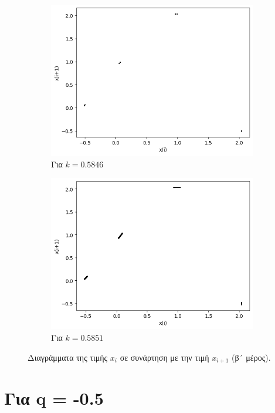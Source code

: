 \begin{figure}[ht]
\begin{subfigure}[b]{0.4\textwidth}
		\includegraphics[width=\textwidth]{LateX images/graphs q03/g13}
		\caption{Για $k=0.5846$}
		\label{f:k25}
	\end{subfigure}
	\hfill
	\begin{subfigure}[b]{0.4\textwidth}
		\centering
		\includegraphics[width=\textwidth]{LateX images/graphs q03/g14}
		\caption{Για $k=0.5851$}
		\label{f:k26}
	\end{subfigure}
	\caption{Διαγράμματα της τιμής \(x_i\) σε συνάρτηση με την τιμή \(x_{i+1}\) (β´ μέρος).}	
\end{figure}

\clearpage

\section{Για q = -0.5}

